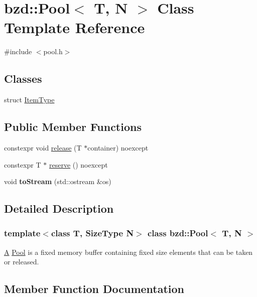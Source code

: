\hypertarget{classbzd_1_1Pool}{}\section{bzd\+:\+:Pool$<$ T, N $>$ Class Template Reference}
\label{classbzd_1_1Pool}


{\ttfamily \#include $<$pool.\+h$>$}

\subsection*{Classes}
\begin{DoxyCompactItemize}
\item 
struct \hyperlink{structbzd_1_1Pool_1_1ItemType}{Item\+Type}
\end{DoxyCompactItemize}
\subsection*{Public Member Functions}
\begin{DoxyCompactItemize}
\item 
constexpr void \hyperlink{classbzd_1_1Pool_aa7b178465046c7b0506e74f778d741c2}{release} (T $\ast$container) noexcept
\item 
constexpr T $\ast$ \hyperlink{classbzd_1_1Pool_a7f29ee139282eda6d22e5b81beb185fb}{reserve} () noexcept
\item 
\mbox{\label{classbzd_1_1Pool_a462c4fb4f29840af32b2a2979bcd58dd}} 
void {\bfseries to\+Stream} (std\+::ostream \&os)
\end{DoxyCompactItemize}


\subsection{Detailed Description}
\subsubsection*{template$<$class T, Size\+Type N$>$\newline
class bzd\+::\+Pool$<$ T, N $>$}

\hyperlink{classA}{A} \hyperlink{classbzd_1_1Pool}{Pool} is a fixed memory buffer containing fixed size elements that can be taken or released. 

\subsection{Member Function Documentation}
\mbox{\label{classbzd_1_1Pool_aa7b178465046c7b0506e74f778d741c2}} 
